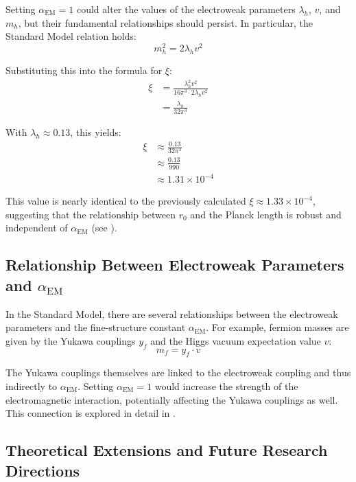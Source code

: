 \documentclass[12pt,a4paper]{article}
\newcommand{\alphaEM}{\alpha_{\text{EM}}}
\begin{document}
	Setting \(\alphaEM = 1\) could alter the values of the electroweak parameters \(\lambda_h\), \(v\), and \(m_h\), but their fundamental relationships should persist. In particular, the Standard Model relation holds:
	\begin{equation}
		m_h^2 = 2\lambda_h v^2
	\end{equation}
	
	Substituting this into the formula for \(\xi\):
	\begin{align}
		\xi &= \frac{\lambda_h^2 v^2}{16\pi^3 \cdot 2\lambda_h v^2} \\
		&= \frac{\lambda_h}{32\pi^3}
	\end{align}
	
	With \(\lambda_h \approx 0.13\), this yields:
	\begin{align}
		\xi &\approx \frac{0.13}{32\pi^3} \\
		&\approx \frac{0.13}{990} \\
		&\approx 1.31 \times 10^{-4}
	\end{align}
	
	This value is nearly identical to the previously calculated \(\xi \approx 1.33 \times 10^{-4}\), suggesting that the relationship between \(r_0\) and the Planck length is robust and independent of \(\alphaEM\) (see \cite{pascher_planck_2025}).
	
	\subsection{Relationship Between Electroweak Parameters and \(\alphaEM\)}
	\label{subsec:electroweak_alpha}
	
	In the Standard Model, there are several relationships between the electroweak parameters and the fine-structure constant \(\alphaEM\). For example, fermion masses are given by the Yukawa couplings \(y_f\) and the Higgs vacuum expectation value \(v\):
	\begin{equation}
		m_f = y_f \cdot v
	\end{equation}
	
	The Yukawa couplings themselves are linked to the electroweak coupling and thus indirectly to \(\alphaEM\). Setting \(\alphaEM = 1\) would increase the strength of the electromagnetic interaction, potentially affecting the Yukawa couplings as well. This connection is explored in detail in \cite{pascher_higgs_2025}.
	
	\subsection{Theoretical Extensions and Future Research Directions}
	\label{subsec:theoretical_extensions}
	
\end{document}
